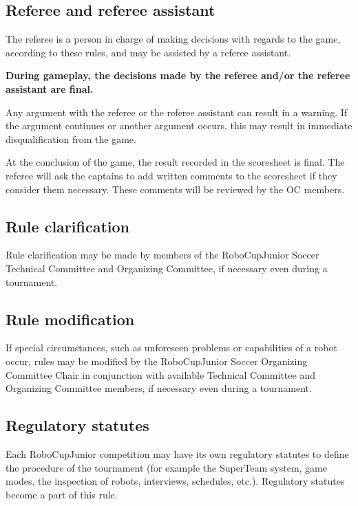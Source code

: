 \documentclass{article}
\begin{document}
\subsection{Referee and referee assistant \label{ref-048}}

The referee is a person in charge of making decisions with regards to the game,
according to these rules, and may be assisted by a referee assistant.

\textbf{During gameplay, the decisions made by the referee and/or the referee assistant are final.}

Any argument with the referee or the referee assistant can result in a warning.
If the argument continues or another argument occurs, this may result in
immediate disqualification from the game.

At the conclusion of the game, the result recorded in the scoresheet is final.
The referee will ask the captains to add written comments to the scoresheet if
they consider them necessary. These comments will be reviewed by the OC
members.

\subsection{Rule clarification \label{ref-049}}

Rule clarification may be made by members of the RoboCupJunior Soccer Technical
Committee and Organizing Committee, if necessary even during a tournament.

\subsection{Rule modification \label{ref-050}}

If special circumstances, such as unforeseen problems or capabilities of a
robot occur, rules may be modified by the RoboCupJunior Soccer Organizing
Committee Chair in conjunction with available Technical Committee and
Organizing Committee members, if necessary even during a tournament.

\subsection{Regulatory statutes \label{ref-051}}

Each RoboCupJunior competition may have its own regulatory statutes to define
the procedure of the tournament (for example the SuperTeam system, game modes,
the inspection of robots, interviews, schedules, etc.). Regulatory statutes
become a part of this rule.
\end{document}

